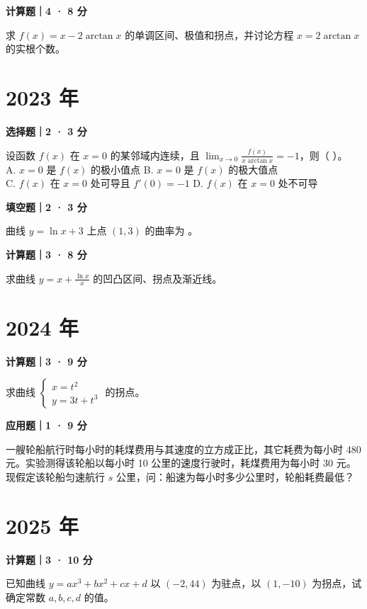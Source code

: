 \textbf{计算题｜4 · 8 分}

求 $f(x) = x - 2\arctan x$ 的单调区间、极值和拐点，并讨论方程 $x = 2\arctan x$ 的实根个数。


\section*{2023 年}


\textbf{选择题｜2 · 3 分}

设函数 $f(x)$ 在 $x = 0$ 的某邻域内连续，且 $\lim_{x \to 0} \frac{f(x)}{x \arctan x} = -1$，则（ \quad ）。\\
A. $x = 0$ 是 $f(x)$ 的极小值点 \quad B. $x = 0$ 是 $f(x)$ 的极大值点\\
C. $f(x)$ 在 $x = 0$ 处可导且 $f'(0) = -1$ \quad D. $f(x)$ 在 $x = 0$ 处不可导


\textbf{填空题｜2 · 3 分}

曲线 $y = \ln x + 3$ 上点 $(1, 3)$ 的曲率为 \underline{\hspace{3cm}}。


\textbf{计算题｜3 · 8 分}

求曲线 $y = x + \frac{\ln x}{x}$ 的凹凸区间、拐点及渐近线。


\section*{2024 年}


\textbf{计算题｜3 · 9 分}

求曲线 $\begin{cases} x = t^2 \\ y = 3t + t^3 \end{cases}$ 的拐点。


\textbf{应用题｜1 · 9 分}

一艘轮船航行时每小时的耗煤费用与其速度的立方成正比，其它耗费为每小时 480 元。实验测得该轮船以每小时 10 公里的速度行驶时，耗煤费用为每小时 30 元。现假定该轮船匀速航行 $s$ 公里，问：船速为每小时多少公里时，轮船耗费最低？


\section*{2025 年}


\textbf{计算题｜3 · 10 分}

已知曲线 $y = ax^3 + bx^2 + cx + d$ 以 $(-2, 44)$ 为驻点，以 $(1, -10)$ 为拐点，试确定常数 $a, b, c, d$ 的值。
